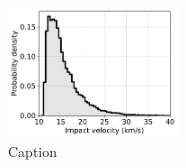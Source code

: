 \documentclass[preprint]{aastex63}
\begin{document}
\appendix

\renewcommand{\thefigure}{A\arabic{figure}}
\renewcommand{\thetable}{A\arabic{table}}
\setcounter{figure}{0}
\setcounter{table}{0}

\begin{figure}
  \centering
  \includegraphics[width=0.4\textwidth]{figures/velocity_distribution.pdf}
  \caption{Caption}
  \label{fig:velocity_distribution}
\end{figure}




\end{document}

